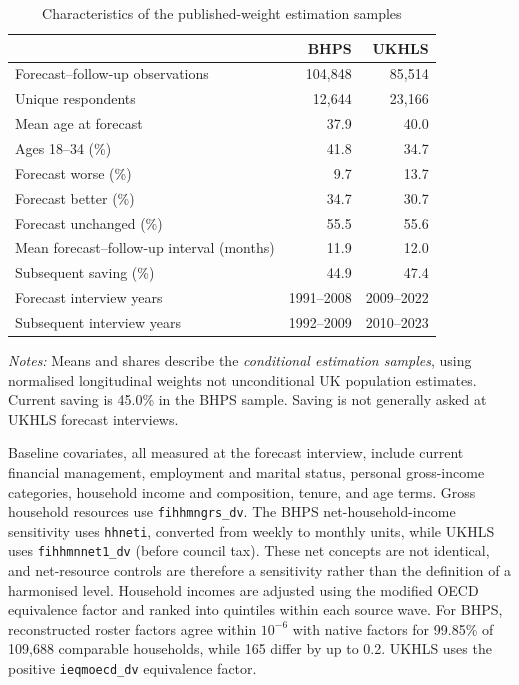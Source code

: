 \begin{table}[!htbp]
\centering
\caption{Characteristics of the published-weight estimation samples}
\label{tab:samples}
\begin{threeparttable}
\small
\begin{tabular}{@{}lrr@{}}
\toprule
& BHPS & UKHLS\\
\midrule
Forecast--follow-up observations & 104,848 & 85,514\\
Unique respondents & 12,644 & 23,166\\
Mean age at forecast & 37.9 & 40.0\\
Ages 18--34 (\%) & 41.8 & 34.7\\
Forecast worse (\%) & 9.7 & 13.7\\
Forecast better (\%) & 34.7 & 30.7\\
Forecast unchanged (\%) & 55.5 & 55.6\\
Mean forecast--follow-up interval (months) & 11.9 & 12.0\\
Subsequent saving (\%) & 44.9 & 47.4\\
Forecast interview years & 1991--2008 & 2009--2022\\
Subsequent interview years & 1992--2009 & 2010--2023\\
\bottomrule
\end{tabular}
\begin{tablenotes}[flushleft]\footnotesize
\item \textit{Notes:} Means and shares describe the \emph{conditional estimation samples}, using normalised longitudinal weights not unconditional UK population estimates. Current saving is 45.0\% in the BHPS sample. Saving is not generally asked at UKHLS forecast interviews.
\end{tablenotes}
\end{threeparttable}
\end{table}
\FloatBarrier

Baseline covariates, all measured at the forecast interview, include current financial management, employment and marital status, personal gross-income categories, household income and composition, tenure, and age terms. Gross household resources use \texttt{fihhmngrs\_dv}. The BHPS net-household-income sensitivity uses \texttt{hhneti}, converted from weekly to monthly units, while UKHLS uses \texttt{fihhmnnet1\_dv} (before council tax). These net concepts are not identical, and net-resource controls are therefore a sensitivity rather than the definition of a harmonised level. Household incomes are adjusted using the modified OECD equivalence factor and ranked into quintiles within each source wave. For BHPS, reconstructed roster factors agree within $10^{-6}$ with native factors for 99.85\% of 109,688 comparable households, while 165 differ by up to 0.2. UKHLS uses the positive \texttt{ieqmoecd\_dv} equivalence factor.

